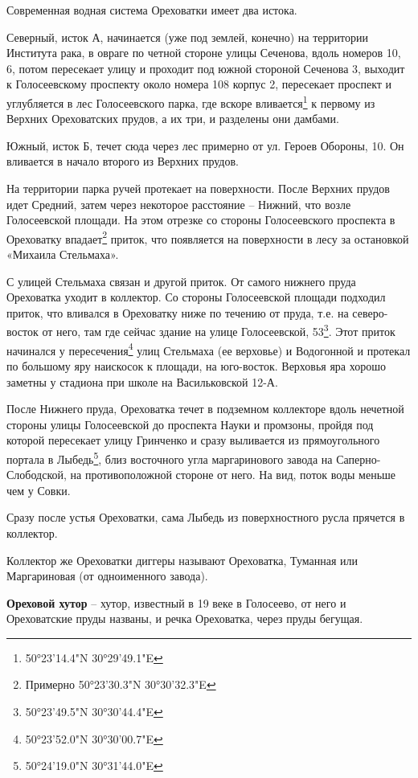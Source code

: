 Современная водная система Ореховатки имеет два истока.

Северный, исток А, начинается (уже под землей, конечно) на территории Института рака, в овраге по четной стороне улицы Сеченова, вдоль номеров 10, 6, потом пересекает улицу и проходит под южной стороной Сеченова 3, выходит к Голосеевскому проспекту около номера 108 корпус 2, пересекает проспект и углубляется в лес Голосеевского парка, где вскоре вливается\footnote{50°23'14.4"N 30°29'49.1"E} к первому из Верхних Ореховатских прудов, а их три, и разделены они дамбами.

Южный, исток Б, течет сюда через лес примерно от ул. Героев Обороны, 10. Он вливается в начало второго из Верхних прудов.

На территории парка ручей протекает на поверхности. После Верхних прудов идет Средний, затем через некоторое расстояние – Нижний, что возле Голосеевской площади. На этом отрезке со стороны Голосеевского проспекта в Ореховатку впадает\footnote{Примерно 50°23'30.3"N 30°30'32.3"E} приток, что появляется на поверхности в лесу за остановкой «Михаила Стельмаха». 

С улицей Стельмаха связан и другой приток. 
От самого нижнего пруда Ореховатка уходит в коллектор. Со стороны Голосеевской площади подходил приток, что вливался в Ореховатку ниже по течению от пруда, т.е. на северо-восток от него, там где сейчас здание на улице Голосеевской, 53\footnote{50°23'49.5"N 30°30'44.4"E}. Этот приток начинался у пересечения\footnote{50°23'52.0"N 30°30'00.7"E} улиц Стельмаха (ее верховье) и Водогонной и протекал по большому яру наискосок к площади, на юго-восток. Верховья яра хорошо заметны у стадиона при школе на Васильковской 12-А.

После Нижнего пруда, Ореховатка течет в подземном коллекторе вдоль нечетной стороны улицы Голосеевской до проспекта Науки и промзоны, пройдя под которой пересекает улицу Гринченко и сразу выливается из прямоугольного портала в Лыбедь\footnote{50°24'19.0"N 30°31'44.0"E}, близ восточного угла маргаринового завода на Саперно-Слободской, на противоположной стороне от него. На вид, поток воды меньше чем у Совки.

Сразу после устья Ореховатки, сама Лыбедь из поверхностного русла прячется в коллектор.

Коллектор же Ореховатки диггеры называют Ореховатка, Туманная или Маргариновая (от одноименного завода).\\

\medskip

\textbf{Ореховой хутор} – хутор, известный в 19 веке в Голосеево, от него и Ореховатские пруды названы, и речка Ореховатка, через пруды бегущая.\\

